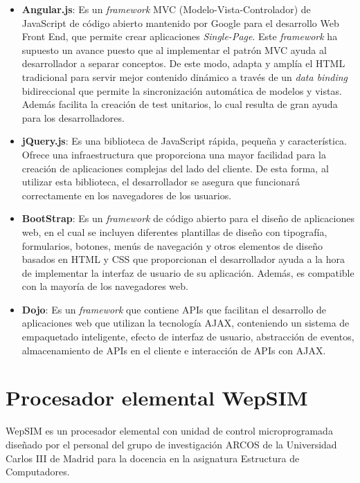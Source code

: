 \begin{itemize}

\item \textbf{Angular.js}: Es un \emph{framework} MVC (Modelo-Vista-Controlador) de JavaScript de código abierto mantenido por Google para el desarrollo Web Front End, que permite crear aplicaciones \textit{Single-Page}. Este \emph{framework} ha supuesto un avance puesto que al implementar el patrón MVC ayuda al desarrollador a separar conceptos. De este modo, adapta y amplía el HTML tradicional para servir mejor contenido dinámico a través de un \textit{data binding} bidireccional que permite la sincronización automática de modelos y vistas. Además facilita la creación de test unitarios, lo cual resulta de gran ayuda para los desarrolladores.

\item \textbf{jQuery.js}: Es una biblioteca de JavaScript rápida, pequeña y característica. Ofrece una infraestructura que proporciona una mayor facilidad para la creación de aplicaciones complejas del lado del cliente. De esta forma, al utilizar esta biblioteca, el desarrollador se asegura que funcionará correctamente en los navegadores de los usuarios.

\item \textbf{BootStrap}: Es un \emph{framework} de código abierto para el diseño de aplicaciones web, en el cual se incluyen diferentes plantillas de diseño con tipografía, formularios, botones, menús de navegación y otros elementos de diseño basados en HTML y CSS que proporcionan el desarrollador ayuda a la hora de implementar la interfaz de usuario de su aplicación. Además, es compatible con la mayoría de los navegadores web.

\item \textbf{Dojo}: Es un \emph{framework} que contiene APIs que facilitan el desarrollo de aplicaciones web que utilizan la tecnología AJAX, conteniendo un sistema de empaquetado inteligente, efecto de interfaz de usuario, abstracción de eventos, almacenamiento de APIs en el cliente e interacción de APIs con AJAX.

\end{itemize}

\section{Procesador elemental WepSIM}
\label{sec:wepsim}

WepSIM es un procesador elemental con unidad de control microprogramada diseñado por el personal del grupo de investigación ARCOS de la Universidad Carlos III de Madrid para la docencia en la asignatura Estructura de Computadores.

